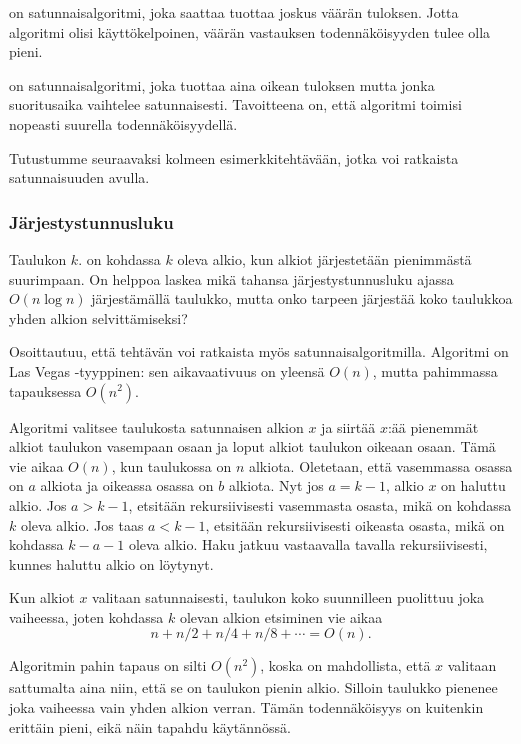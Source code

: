 
 on satunnaisalgoritmi,
joka saattaa tuottaa joskus väärän tuloksen.
Jotta algoritmi olisi käyttökelpoinen,
väärän vastauksen todennäköisyyden tulee olla pieni.


 on satunnaisalgoritmi,
joka tuottaa aina oikean tuloksen mutta jonka
suoritusaika vaihtelee satunnaisesti.
Tavoitteena on, että algoritmi toimisi nopeasti
suurella todennäköisyydellä.

Tutustumme seuraavaksi kolmeen esimerkkitehtävään,
jotka voi ratkaista satunnaisuuden avulla.

\subsubsection{Järjestystunnusluku}


Taulukon $k$. 
on kohdassa $k$ oleva alkio,
kun alkiot järjestetään
pienimmästä suurimpaan.
On helppoa laskea mikä tahansa
järjestystunnusluku ajassa $O(n \log n)$
järjestämällä taulukko,
mutta onko tarpeen järjestää koko taulukkoa
yhden alkion selvittämiseksi?

Osoittautuu, että tehtävän voi ratkaista myös
satunnaisalgoritmilla.
Algoritmi on Las Vegas -tyyppinen:
sen aikavaativuus on yleensä $O(n)$,
mutta pahimmassa tapauksessa $O(n^2)$.

Algoritmi valitsee taulukosta satunnaisen alkion $x$
ja siirtää $x$:ää pienemmät alkiot
taulukon vasempaan osaan ja loput alkiot
taulukon oikeaan osaan.
Tämä vie aikaa $O(n)$, kun taulukossa on $n$ alkiota.
Oletetaan, että vasemmassa osassa on $a$
alkiota ja oikeassa osassa on $b$ alkiota.
Nyt jos $a=k-1$, alkio $x$ on haluttu alkio.
Jos $a>k-1$, etsitään rekursiivisesti
vasemmasta osasta, mikä on kohdassa $k$ oleva alkio.
Jos taas $a<k-1$, etsitään rekursiivisesti
oikeasta osasta, mikä on kohdassa $k-a-1$ oleva alkio.
Haku jatkuu vastaavalla tavalla rekursiivisesti,
kunnes haluttu alkio on löytynyt.

Kun alkiot $x$ valitaan satunnaisesti,
taulukon koko suunnilleen puolittuu
joka vaiheessa, joten kohdassa $k$ olevan
alkion etsiminen vie aikaa
\[n+n/2+n/4+n/8+\cdots=O(n).\]

Algoritmin pahin tapaus on silti $O(n^2)$,
koska on mahdollista,
että $x$ valitaan sattumalta aina niin,
että se on taulukon pienin alkio.
Silloin taulukko pienenee joka vaiheessa
vain yhden alkion verran.
Tämän todennäköisyys on kuitenkin erittäin pieni,
eikä näin tapahdu käytännössä.

